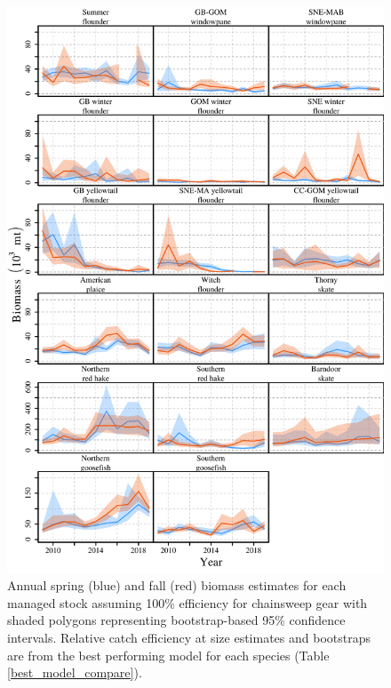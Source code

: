 \documentclass[
  12pt,
]{article}
\begin{document}
\begin{figure}
\caption{Annual spring (blue) and fall (red) biomass estimates for each managed stock assuming 100\% efficiency for chainsweep gear with shaded polygons representing bootstrap-based 95\% confidence intervals. Relative catch efficiency at size estimates and bootstraps are from the best performing model for each species (Table \ref{best_model_compare}).}\label{stock_biomass_plot}
\begin{center}
\includegraphics[height = 0.8\textheight]{stock_biomass_plot.pdf}
\end{center}
\end{figure}

\clearpage
\end{document}
